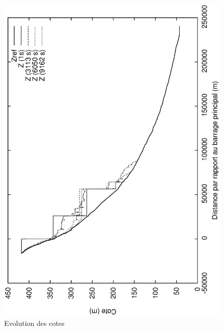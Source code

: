 \documentclass[a4paper,10pt]{article}
\begin{document}
\begin{figure}
 \begin{center}
  \includegraphics[angle=270,width=15cm]{evol_cotes.eps}
  \caption{Evolution des cotes}
  \label{fig4}
 \end{center}
\end{figure}
\end{document}
